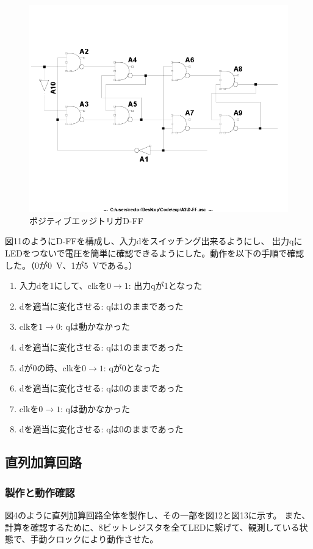 \documentclass[10pt,a4j,dvipdfmx]{jsarticle}
\makeatletter
\let\@oldsubsec\subsection
\renewcommand{\subsection}[1]{\vspace{-7pt}\@oldsubsec{#1}}
\makeatother
\begin{document}
\begin{figure}[H]
       \centering
       \includegraphics[width=12cm]{D-FF.png}
       \caption{ポジティブエッジトリガD-FF}
\end{figure}

図11のようにD-FFを構成し、入力dをスイッチング出来るようにし、
出力qにLEDをつないで電圧を簡単に確認できるようにした。動作を以下の手順で確認した。（0が\SI{0}{\volt}、1が\SI{5}{\volt}である。）

\begin{enumerate}
\item 入力dを1にして、clkを$0\to1$: 出力qが1となった
\item dを適当に変化させる: qは1のままであった
\item clkを$1\to0$: qは動かなかった
\item dを適当に変化させる: qは1のままであった
\item dが0の時、clkを$0\to1$: qが0となった
\item dを適当に変化させる: qは0のままであった
\item clkを$0\to1$: qは動かなかった
\item dを適当に変化させる: qは0のままであった
\end{enumerate}

\subsection{直列加算回路}
\subsubsection{製作と動作確認}
図4のように直列加算回路全体を製作し、その一部を図12と図13に示す。
また、計算を確認するために、8ビットレジスタを全てLEDに繋げて、観測している状態で、手動クロックにより動作させた。
\end{document}
